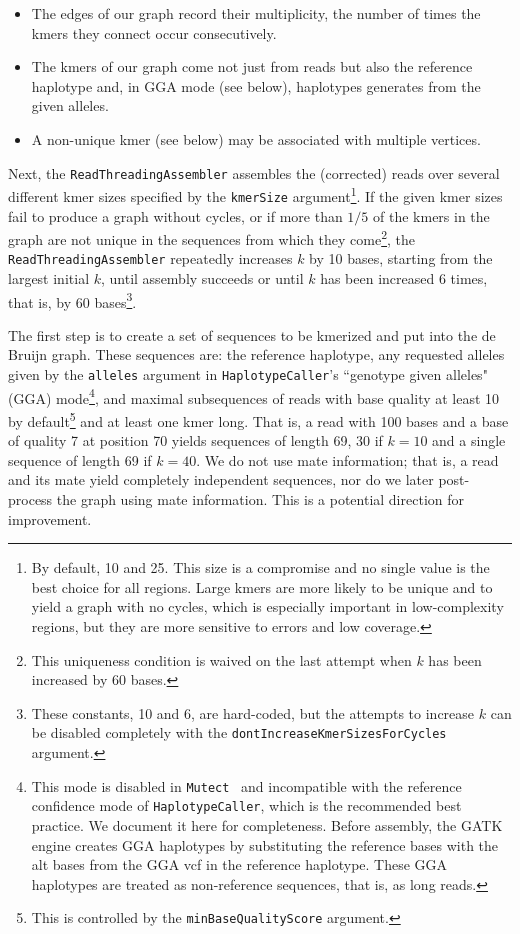 \documentclass[nofootinbib,amssymb,amsmath]{revtex4}
\newcommand{\HC}{\texttt{HaplotypeCaller}}
\newcommand{\Mutect}{\texttt{Mutect}}
\newcommand{\code}[1]{\texttt{#1}}
\begin{document}
\begin{itemize}
\item The edges of our graph record their multiplicity, the number of times the kmers they connect occur consecutively.
\item The kmers of our graph come not just from reads but also the reference haplotype and, in GGA mode (see below), haplotypes generates from the given alleles.
\item A non-unique kmer (see below) may be associated with multiple vertices.
\end{itemize}

Next, the \code{ReadThreadingAssembler} assembles the (corrected) reads over several different kmer sizes specified by the \code{kmerSize} argument\footnote{By default, 10 and 25.  This size is a compromise and no single value is the best choice for all regions.  Large kmers are more likely to be unique and to yield a graph with no cycles, which is especially important in low-complexity regions, but they are more sensitive to errors and low coverage.}.  If the given kmer sizes fail to produce a graph without cycles, or if more than $1/5$ of the kmers in the graph are not unique in the sequences from which they come\footnote{This uniqueness condition is waived on the last attempt when $k$ has been increased by 60 bases.}, the \code{ReadThreadingAssembler} repeatedly increases $k$ by 10 bases, starting from the largest initial $k$, until assembly succeeds or until $k$ has been increased 6 times, that is, by 60 bases\footnote{These constants, 10 and 6, are hard-coded, but the attempts to increase $k$ can be disabled completely with the \code{dontIncreaseKmerSizesForCycles} argument.}.

The first step is to create a set of sequences to be kmerized and put into the de Bruijn graph.  These sequences are: the reference haplotype, any requested alleles given by the \code{alleles} argument in \HC's ``genotype given alleles" (GGA) mode\footnote{This mode is disabled in \Mutect~ and incompatible with the reference confidence mode of \HC, which is the recommended best practice.  We document it here for completeness.  Before assembly, the GATK engine creates GGA haplotypes by substituting the reference bases with the alt bases from the GGA vcf in the reference haplotype.  These GGA haplotypes are treated as non-reference sequences, that is, as long reads.}, and maximal subsequences of reads with base quality at least 10 by default\footnote{This is controlled by the \code{minBaseQualityScore} argument.} and at least one kmer long.  That is, a read with 100 bases and a base of quality 7 at position 70 yields sequences of length 69, 30 if $k = 10$ and a single sequence of length 69 if $k = 40$.  We do not use mate information; that is, a read and its mate yield completely independent sequences, nor do we later post-process the graph using mate information.  This is a potential direction for improvement.
\end{document}
